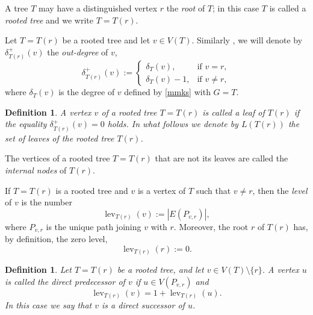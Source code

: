 \documentclass{raex}
\newtheorem{defn}[thm]{Definition}
\theoremstyle{definition}
\theoremstyle{remark}
\numberwithin{equation}{section}
\begin{document}
A tree $T$ may have a distinguished vertex $r$  the {\it root} of $T$; in this case $T$ is called a {\it rooted tree} and we write $T=T(r)$.

Let $T=T(r)$ be a rooted tree and let $v\in V(T)$. Similarly \cite{Dov2019pNUAA,DP2018pNUAA,DP2019PNUAA,DP2020pNUAA,DPT2015,DPT2017FPTA}, we will denote by $\delta_{T(r)}^{+}(v)$ the {\it out-degree} of $v$,
\begin{equation}
    \label{zbh1}
\delta_{T(r)}^{+}(v):=
\begin{cases}
\delta_T(v), & \text{if } v=r,\\
\delta_T(v)-1, & \text{if } v\ne r,
\end{cases}
\end{equation}
where $\delta_T(v)$ is the degree of $v$ defined by \eqref{mmks} with $G=T$.






\begin{defn}
    \label{scm}
A vertex $v$ of a rooted tree $T=T(r)$ is called a {\it leaf} of $T(r)$ if the equality $\delta^+_{T(r)}(v)=0$ holds. In what follows we denote by $L(T(r))$ the set of leaves of the rooted tree $T(r)$.
\end{defn}





The vertices of a rooted tree $T=T(r)$ that are not its leaves are called the {\it internal nodes} of $T(r)$.

If $T = T(r)$ is a rooted tree and $v$ is a vertex of $T$ such that $v \neq r$, 
then the {\it level} of $v$ is the number 
\begin{equation}\label{lev}
    \operatorname{lev}_{T(r)}(v):=|E(P_{v,r})|,
\end{equation}
where $P_{v,r}$ is the unique path joining $v$ with $r$.
Moreover, the root $r$ of $T(r)$ has, by definition,  the zero level, 
\begin{equation}
    \label{p1}
    \operatorname{lev}_{T(r)}(r):=0.
\end{equation}





\begin{defn}\label{sqbh}
Let $T=T(r)$ be a rooted tree, and let $v\in V(T)\setminus \{r\}$. A vertex $u$ is called 
the {\it direct predecessor}
of $v$ if $u \in V(P_{v,r})$ and 
\begin{equation*}
\operatorname{lev}_{T(r)}(v)=1+\operatorname{lev}_{T(r)}(u).
\end{equation*}
In this case we say that $v$ is a {\it direct successor}
of $u$.
\end{defn}
\end{document}
